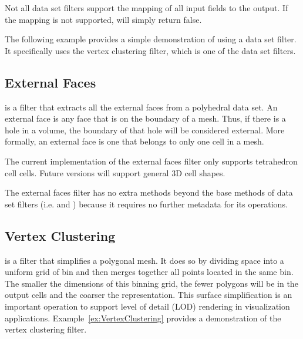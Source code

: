 \begin{commonerrors}
  Not all data set filters support the mapping of all input fields to the
  output. If the mapping is not supported, 
  will simply return false.
\end{commonerrors}

The following example provides a simple demonstration of using a data set
filter. It specifically uses the vertex clustering filter, which is one of
the data set filters.


\subsection{External Faces}


 is a filter that extracts all the external faces
from a polyhedral data set. An external face is any face that is on the
boundary of a mesh. Thus, if there is a hole in a volume, the boundary of
that hole will be considered external. More formally, an external face is
one that belongs to only one cell in a mesh.

\begin{commonerrors}
  The current implementation of the external faces filter only supports
  tetrahedron cell cells. Future versions will support general 3D cell
  shapes. 
\end{commonerrors}

The external faces filter has no extra methods beyond the base methods of
data set filters (i.e.  and
) because it requires no further metadata for
its operations.



\subsection{Vertex Clustering}


 is a filter that simplifies a polygonal mesh.
It does so by dividing space into a uniform grid of bin and then merges
together all points located in the same bin. The smaller the dimensions of
this binning grid, the fewer polygons will be in the output cells and the
coarser the representation. This surface simplification is an important
operation to support level of detail (LOD)
rendering in visualization applications. Example~\ref{ex:VertexClustering}
provides a demonstration of the vertex clustering filter.

